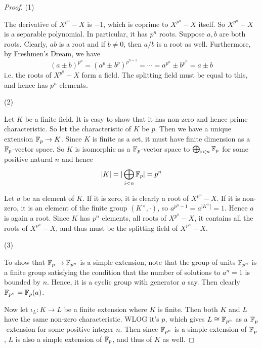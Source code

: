 \documentclass[../book.tex]{subfiles}
\begin{document}
\begin{proof}
    
    (1)
        
        The derivative of $X^{p^n} - X$ is $-1$, 
        which is coprime to $X^{p^n} - X$ itself.
        So $X^{p^n} - X$ is a separable polynomial. 
        In particular, it has $p^n$ roots. 
        Suppose $a, b$ are both roots.
        Clearly, $ab$ is a root and if $b \neq 0$, then $a / b$ is a root as well.
        Furthermore, by Freshmen's Dream, we have \[
            (a \pm b)^{p^n} = (a^p \pm b^p)^{p^{n-1}} = \cdots
            = a^{p^n} \pm b^{p^n} = a \pm b
        \]
        i.e. the roots of $X^{p^n} - X$ form a field.
        The splitting field must be equal to this, and hence has $p^n$ elements.
        
    (2)
        
        Let $K$ be a finite field. 
        It is easy to show that it has non-zero and hence prime characteristic. 
        So let the characteristic of $K$ be $p$. 
        Then we have a unique extension $\mathbb{F}_p \to K$. 
        Since $K$ is finite as a set, 
        it must have finite dimension as a $\mathbb{F}_p$-vector space.
        So $K$ is isomorphic as a $\mathbb{F}_p$-vector space to $\bigoplus_{i < n} \mathbb{F}_p$ 
        for some positive natural $n$ and hence \[
            |K| = |\bigoplus_{i < n} \mathbb{F}_p| = p^n
        \]
        
        Let $a$ be an element of $K$.
        If it is zero, it is clearly a root of $X^{p^n} - X$.
        If it is non-zero, it is an element of the finite group $(K^\times,\cdot)$,
        so $a^{p^n - 1} = a^{|K^\times|} = 1$.
        Hence $a$ is again a root. 
        Since $K$ has $p^n$ elements, all roots of $X^{p^n} - X$, 
        it contains all the roots of $X^{p^n} - X$,
        and thus must be the splitting field of $X^{p^n} - X$.
        
    (3)
        
        To show that $\mathbb{F}_p \to \mathbb{F}_{p^n}$ is a simple extension,
        note that the group of units $\mathbb{F}_{p^n}$ is a finite group
        satisfying the condition that the number of solutions to $a^n = 1$ 
        is bounded by $n$. 
        Hence, it is a cyclic group with generator $a$ say. 
        Then clearly $\mathbb{F}_{p^n} = \mathbb{F}_p(a)$. 
        
        Now let $\iota_L : K \to L$ be a finite extension where $K$ is finite.
        Then both $K$ and $L$ have the same non-zero characteristic.
        WLOG it's $p$, which gives $L \cong \mathbb{F}_{p^n}$ as a $\mathbb{F}_p$-extension
        for some positive integer $n$. 
        Then since $\mathbb{F}_{p^n}$ is a simple extension of $\mathbb{F}_p$,
        $L$ is also a simple extension of $\mathbb{F}_p$,
        and thus of $K$ as well. 
        

\end{proof}
\end{document}
